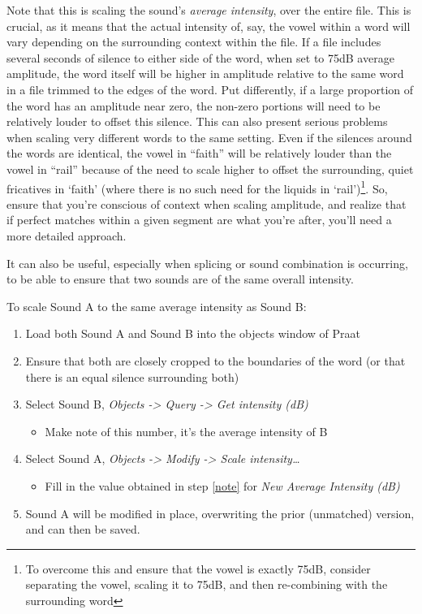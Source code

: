 \documentclass[11pt]{article}
\def\tightlist{}
\begin{document}
Note that this is scaling the sound's \emph{average intensity}, over the
entire file. This is crucial, as it means that the actual intensity of,
say, the vowel within a word will vary depending on the surrounding
context within the file. If a file includes several seconds of silence
to either side of the word, when set to 75dB average amplitude, the word
itself will be higher in amplitude relative to the same word in a file
trimmed to the edges of the word. Put differently, if a large proportion
of the word has an amplitude near zero, the non-zero portions will need
to be relatively louder to offset this silence. This can also present
serious problems when scaling very different words to the same setting.
Even if the silences around the words are identical, the vowel in
``faith'' will be relatively louder than the vowel in ``rail'' because
of the need to scale higher to offset the surrounding, quiet fricatives
in `faith' (where there is no such need for the liquids in
`rail')\footnote{To overcome this and ensure that the vowel is exactly 75dB, consider separating the vowel, scaling it to 75dB, and then re-combining with the surrounding word}.
So, ensure that you're conscious of context when scaling amplitude, and
realize that if perfect matches within a given segment are what you're
after, you'll need a more detailed approach.

It can also be useful, especially when splicing or sound combination is
occurring, to be able to ensure that two sounds are of the same overall
intensity.

To scale Sound A to the same average intensity as Sound B:

\begin{enumerate}
\def\labelenumi{\arabic{enumi}.}
\tightlist
\item
  Load both Sound A and Sound B into the objects window of Praat
\item
  Ensure that both are closely cropped to the boundaries of the word (or
  that there is an equal silence surrounding both)
\item
  Select Sound B, \emph{Objects -\textgreater{} Query -\textgreater{}
  Get intensity (dB)}

  \begin{itemize}
  \tightlist
  \item
    \label{note}Make note of this number, it's the average intensity of
    B
  \end{itemize}
\item
  Select Sound A, \emph{Objects -\textgreater{} Modify -\textgreater{}
  Scale intensity\ldots{}}

  \begin{itemize}
  \tightlist
  \item
    Fill in the value obtained in step \ref{note} for \emph{New Average
    Intensity (dB)}
  \end{itemize}
\item
  Sound A will be modified in place, overwriting the prior (unmatched)
  version, and can then be saved.
\end{enumerate}
\end{document}
